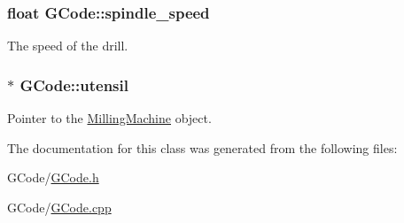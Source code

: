 \hypertarget{class_g_code_a03613c115ef107290355c78384ebee27}{
\subsubsection[{spindle\+\_\+speed}]{\setlength{\rightskip}{0pt plus 5cm}float G\+Code\+::spindle\+\_\+speed}}\label{class_g_code_a03613c115ef107290355c78384ebee27}


The speed of the drill. 

\hypertarget{class_g_code_a9a737c33f133cf515926d0f2b612bd22}{
\subsubsection[{utensil}]{$\ast$ G\+Code\+::utensil}}\label{class_g_code_a9a737c33f133cf515926d0f2b612bd22}


Pointer to the \hyperlink{class_milling_machine}{Milling\+Machine} object. 



The documentation for this class was generated from the following files\+:\begin{DoxyCompactItemize}
\item 
G\+Code/\hyperlink{_g_code_8h}{G\+Code.\+h}\item 
G\+Code/\hyperlink{_g_code_8cpp}{G\+Code.\+cpp}\end{DoxyCompactItemize}
